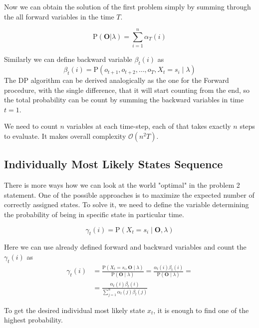\documentclass[thesis=M,english]{FITthesis}[2012/10/20]
\newcommand{\matr}[1]{\mathbf{#1}}
\begin{document}
Now we can obtain the solution of the first problem simply by summing through the all forward variables in the time $T$.

\begin{equation}
\mathrm{P}(\matr{O}|\lambda) = \sum_{i=1}^n \alpha_T(i)
\end{equation} 

Similarly we can define backward variable $\beta_t(i)$ as
\begin{equation}
\beta_t(i) = \mathrm{P}(o_{t+1},o_{t+2},\dots,o_T,X_t = s_i \mid \lambda ) 
\end{equation}
The DP algorithm can be derived analogically as the one for the Forward procedure, with the single difference, that it will start counting from the end, so the total probability can be count by summing the backward variables in time $t=1$.

We need to count $n$ variables at each time-step, each of that takes exactly $n$ steps to evaluate. It makes overall complexity $\mathcal{O}(n^2T)$.    

\subsection{Individually Most Likely States Sequence}\label{sec:ssp}
There is more ways how we can look at the world "optimal" in the problem 2 statement. One of the possible approaches is to maximize the expected number of correctly assigned states. To solve it, we need to define the variable determining the probability of being in specific state in particular time.

\begin{equation}
\gamma_t(i) = \mathrm{P}(X_t = s_i \mid \matr{O},\lambda ) 
\end{equation}

Here we can use already defined forward and backward variables and count the $\gamma_t(i)$ as
\begin{equation}
\begin{aligned}
\gamma_t(i) &= \frac{ \mathrm{P}( X_t = s_i, \matr{O} \mid \lambda )}{ \mathrm{P}( \matr{O} \mid \lambda )} =
               \frac{  \alpha_t(i) \beta_t(i) }{ \mathrm{P}( \matr{O} \mid \lambda )} = \\
            &= \frac{  \alpha_t(i) \beta_t(i) }{ \sum\limits_{j=1}^n \alpha_t(j) \beta_t(j) } 
\end{aligned}
\end{equation}

To get the desired individual most likely state $x_t$, it is enough to find one of the highest probability.
\end{document}
